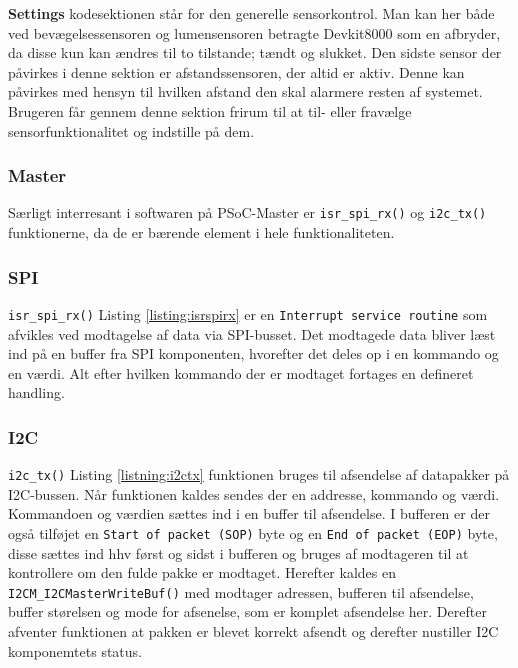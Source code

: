 \textbf{Settings} kodesektionen står for den generelle sensorkontrol. Man kan her både ved bevægelsessensoren og lumensensoren betragte Devkit8000 som en afbryder, da disse kun kan ændres til to tilstande; tændt og slukket. Den sidste sensor der påvirkes i denne sektion er afstandssensoren, der altid er aktiv. Denne kan påvirkes med hensyn til hvilken afstand den skal alarmere resten af systemet. Brugeren får gennem denne sektion frirum til at til- eller fravælge sensorfunktionalitet og indstille på dem.

\subsubsection{Master}

Særligt interresant i softwaren på PSoC-Master er \verb+isr_spi_rx()+ og \verb+i2c_tx()+ funktionerne, da de er bærende element i hele funktionaliteten.

\subsubsection{SPI}



\verb+isr_spi_rx()+ Listing \ref{listing:isrspirx} er en \verb+Interrupt service routine+ som afvikles ved modtagelse af data via SPI-busset. Det modtagede data bliver læst ind på en buffer fra SPI komponenten, hvorefter det deles op i en kommando og en værdi. Alt efter hvilken kommando der er modtaget fortages en defineret handling. 


\subsubsection{I2C}



\verb+i2c_tx()+ Listing \ref{listning:i2ctx} funktionen bruges til afsendelse af datapakker på I2C-bussen. Når funktionen kaldes sendes der en addresse, kommando og værdi. Kommandoen og værdien sættes ind i en buffer til afsendelse. I bufferen er der også tilføjet en \verb+Start of packet (SOP)+ byte og en \verb+End of packet (EOP)+ byte, disse sættes ind hhv først og sidst i bufferen og bruges af modtageren til at kontrollere om den fulde pakke er modtaget.
Herefter kaldes en \verb+I2CM_I2CMasterWriteBuf()+ med modtager adressen, bufferen til afsendelse, buffer størelsen og mode for afsenelse, som er komplet afsendelse her. Derefter afventer funktionen at pakken er blevet korrekt afsendt og derefter nustiller I2C komponemtets status.



